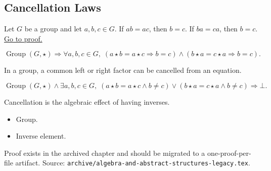\subsection*{Cancellation Laws}
\label{subsec:cancellation-laws}

\begin{proposition}
\label{prop:group-cancellation}
Let $G$ be a group and let $a,b,c \in G$.
If $ab = ac$, then $b=c$.
If $ba = ca$, then $b=c$.
\hyperref[prf:group-cancellation]{Go to proof.}
\end{proposition}

\begin{remark*}
\[
\operatorname{Group}(G,\star)
\Longrightarrow
\forall a,b,c\in G,\;
(a\star b=a\star c \Rightarrow b=c)
\land
(b\star a=c\star a \Rightarrow b=c).
\]
\end{remark*}

\begin{remark*}
In a group, a common left or right factor can be cancelled from an equation.
\end{remark*}

\begin{remark*}
\[
\operatorname{Group}(G,\star)
\land
\exists a,b,c\in G,\;
(a\star b=a\star c \land b\neq c)
\lor
(b\star a=c\star a \land b\neq c)
\Longrightarrow \bot.
\]
\end{remark*}

\begin{remark*}[Interpretation]
Cancellation is the algebraic effect of having inverses.
\end{remark*}

\begin{remark*}[Dependencies]
\begin{itemize}
  \item Group.
  \item Inverse element.
\end{itemize}
\end{remark*}

\begin{remark*}
Proof exists in the archived chapter and should be migrated to a
one-proof-per-file artifact.
Source: \texttt{archive/algebra-and-abstract-structures-legacy.tex}.
\end{remark*}

